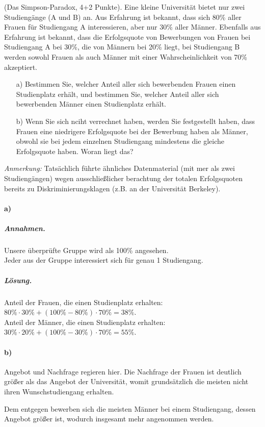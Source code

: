 \documentclass[twoside]{article}
\begin{document}
(Das Simpson-Paradox, 4+2 Punkte).
Eine kleine Universität bietet nur zwei Studiengänge (A und B) an.
Aus Erfahrung ist bekannt, dass sich 80\% aller Frauen für Studiengang A interessieren, aber nur 30\% aller Männer.
Ebenfalls aus Erfahrung ist bekannt, dass die Erfolgsquote von Bewerbungen von Frauen bei Studiengang A bei 30\%, die von Männern bei 20\% liegt, bei Studiengang B werden sowohl Frauen als auch Männer mit einer Wahrscheinlichkeit von 70\% akzeptiert.
\begin{enumerate}
	\item[a)] Bestimmen Sie, welcher Anteil aller sich bewerbenden Frauen einen Studienplatz erhält, und bestimmen Sie, welcher Anteil aller sich bewerbenden Männer einen Studienplatz erhält.
	\item[b)] Wenn Sie sich nciht verrechnet haben, werden Sie festgestellt haben, dass Frauen eine niedrigere Erfolgsquote bei der Bewerbung haben als Männer, obwohl sie bei jedem einzelnen Studiengang mindestens die gleiche Erfolgsquote haben.
	Woran liegt das?
\end{enumerate}
\textit{Anmerkung:} Tatsächlich führte ähnliches Datenmaterial (mit mer als zwei Studiengängen) wegen ausschließlicher berachtung der totalen Erfolgsquoten bereits zu Diskriminierungsklagen (z.B. an der Universität Berkeley).
\paragraph{a)}
\subparagraph{Annahmen.}
Unsere überprüfte Gruppe wird als 100\% angesehen.\\
Jeder aus der Gruppe interessiert sich für genau 1 Studiengang.
\subparagraph{Lösung.}
Anteil der Frauen, die einen Studienplatz erhalten: $80\% \cdot 30\% + (100\%-80\%) \cdot 70\% = 38\%$.\\
Anteil der Männer, die einen Studienplatz erhalten: $30\% \cdot 20\% + (100\%-30\%) \cdot 70\% = 55\%$.
\paragraph{b)}
Angebot und Nachfrage regieren hier.
Die Nachfrage der Frauen ist deutlich größer als das Angebot der Universität, womit grundsätzlich die meisten nicht ihren Wunschstudiengang erhalten.

Dem entgegen bewerben sich die meisten Männer bei einem Studiengang, dessen Angebot größer ist, wodurch insgesamt mehr angenommen werden.
\fi
\end{document}
